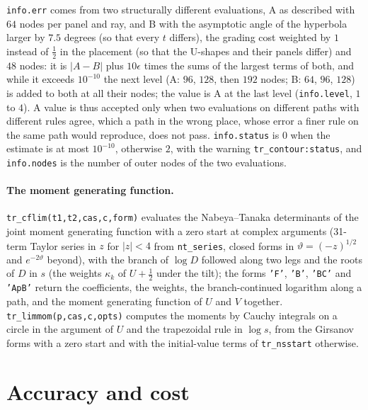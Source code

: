 \documentclass[11pt]{article}
\newcommand{\code}[1]{\texttt{#1}}
\begin{document}
\code{info.err} comes from two structurally different evaluations, A as described with $64$ nodes per panel and ray, and B with the asymptotic angle of the hyperbola larger by $7.5$ degrees (so that every $t$ differs), the grading cost weighted by $1$ instead of $\frac12$ in the placement (so that the U-shapes and their panels differ) and $48$ nodes: it is $|A-B|$ plus $10\epsilon$ times the sums of the largest terms of both, and while it exceeds $10^{-10}$ the next level (A: $96$, $128$, then $192$ nodes; B: $64$, $96$, $128$) is added to both at all their nodes; the value is A at the last level (\code{info.level}, $1$ to $4$).  A value is thus accepted only when two evaluations on different paths with different rules agree, which a path in the wrong place, whose error a finer rule on the same path would reproduce, does not pass.  \code{info.status} is $0$ when the estimate is at most $10^{-10}$, otherwise $2$, with the warning \code{tr\_contour:status}, and \code{info.nodes} is the number of outer nodes of the two evaluations.

\paragraph{The moment generating function.}  \code{tr\_cflim(t1,t2,cas,c,form)} evaluates the Nabeya--Tanaka determinants of the joint moment generating function with a zero start at complex arguments (31-term Taylor series in $z$ for $|z|<4$ from \code{nt\_series}, closed forms in $\vartheta=(-z)^{1/2}$ and $e^{-2\vartheta}$ beyond), with the branch of $\log D$ followed along two legs and the roots of $D$ in $s$ (the weights $\kappa_k$ of $U+\frac12$ under the tilt); the forms \code{'F'}, \code{'B'}, \code{'BC'} and \code{'ApB'} return the coefficients, the weights, the branch-continued logarithm along a path, and the moment generating function of $U$ and $V$ together.  \code{tr\_limmom(p,cas,c,opts)} computes the moments by Cauchy integrals on a circle in the argument of $U$ and the trapezoidal rule in $\log s$, from the Girsanov forms with a zero start and with the initial-value terms of \code{tr\_nsstart} otherwise.

\section{Accuracy and cost}
\label{sec:accuracy}
\end{document}
